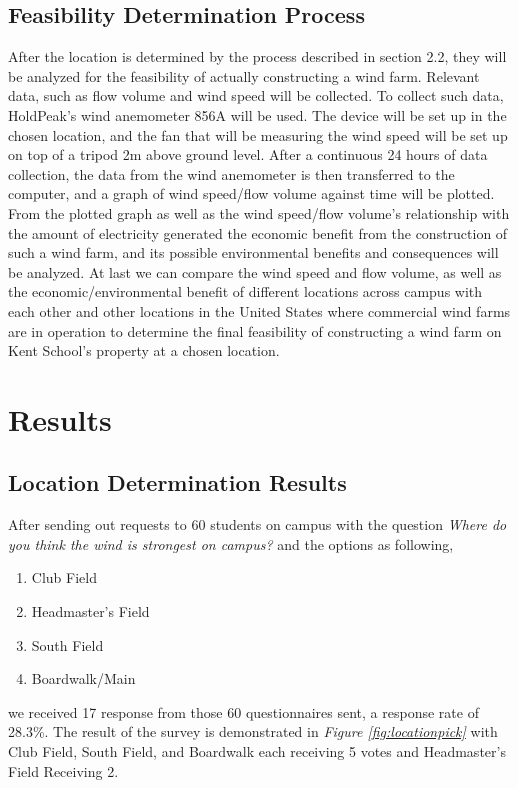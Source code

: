 \documentclass[review]{elsarticle}
\begin{document}
\subsection{Feasibility Determination Process}
\label{sec:methods:feasdeterprocess}
After the location is determined by the process described in section 2.2, they will be analyzed for the feasibility of actually constructing 
a wind farm. Relevant data, such as flow volume and wind speed will be collected. To collect such data, HoldPeak's wind anemometer 856A will 
be used. The device will be set up in the chosen location, and the fan that will be measuring the wind speed will be set up on top of a tripod 
2m above ground level. After a continuous 24 hours of data collection, the data from the wind anemometer is then transferred to the computer, 
and a graph of wind speed/flow volume against time will be plotted.
\\\indent From the plotted graph as well as the wind speed/flow volume's relationship with the amount of electricity generated the economic 
benefit from the construction of such a wind farm, and its possible environmental benefits and consequences will be analyzed. At last we can 
compare the wind speed and flow volume, as well as the economic/environmental benefit of different locations across campus with each other 
and other locations in the United States where commercial wind farms are in operation to determine the final feasibility of constructing a 
wind farm on Kent School's property at a chosen location.



\section{Results}
\label{sec:results}
\subsection{Location Determination Results}
\label{sec:results:locdeterresults}
After sending out requests to 60 students on campus with the question \textit{Where do you think the wind is strongest on campus?} and the options as following,
\begin{enumerate}
    \item {Club Field}
    \item {Headmaster's Field}
    \item {South Field}
    \item {Boardwalk/Main}   
\end{enumerate}
we received 17 response from those 60 questionnaires sent, a response rate of 28.3\%. The result of the survey is demonstrated in 
\textit{Figure \ref{fig:locationpick}} with Club Field, South Field, and Boardwalk each receiving 5 votes and Headmaster's Field Receiving 2. 
\end{document}
